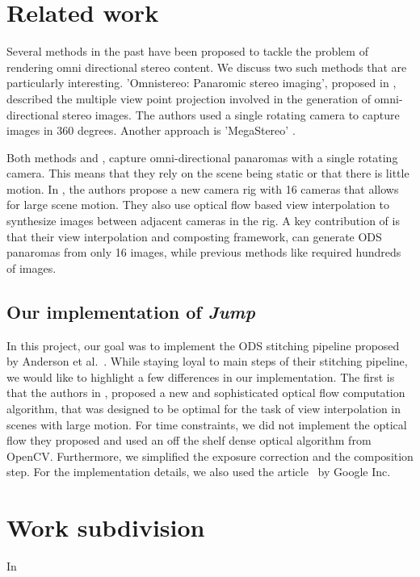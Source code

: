 \documentclass[10pt,twocolumn,letterpaper]{article}
\begin{document}
\section{Related work}
\label{related-work}
Several methods in the past have been proposed to tackle the problem of rendering omni directional stereo content. We discuss two such methods that are particularly interesting. 'Omnistereo: Panaromic stereo imaging', proposed in \cite{peleg}, described the multiple view point projection involved in the generation of omni-directional stereo images. The authors used a single rotating camera to capture images in 360 degrees. Another approach is 'MegaStereo' \cite{megastereo}. 

Both methods \cite{peleg} and \cite{megastereo}, capture omni-directional panaromas with a single rotating camera. This means that they rely on the scene being static or that there is little motion. In \cite{jump16}, the authors propose a new camera rig with 16 cameras that allows for large scene motion. They also use optical flow based view interpolation to synthesize images between adjacent cameras in the rig. A key contribution of \cite{jump16} is that their view interpolation and composting framework, can generate ODS panaromas from only 16 images, while previous methods like \cite{megastereo} required hundreds of images. 

\subsection{Our implementation of \textit{Jump} \cite{jump16}}
In this project, our goal was to implement the ODS stitching pipeline proposed by Anderson et al.~\cite{jump16}. While staying loyal to main steps of their stitching pipeline, we would like to highlight a few differences in our implementation. The first is that the authors in \cite{jump16}, proposed a new and sophisticated optical flow computation algorithm, that was designed to be optimal for the task of view interpolation in scenes with large motion.  For time constraints, we did not implement the optical flow they proposed and used an off the shelf dense optical algorithm from OpenCV. Furthermore, we simplified the exposure correction and the composition step. For the implementation details, we also used the article~\cite{ods} by Google Inc.

\section{Work subdivision}
\label{work-division}
In
\end{document}
